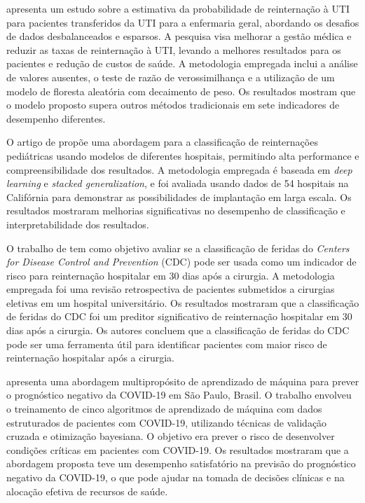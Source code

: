  apresenta um estudo sobre a estimativa da probabilidade de reinternação à UTI para pacientes transferidos da UTI para a enfermaria geral, abordando os desafios de dados desbalanceados e esparsos. A pesquisa visa melhorar a gestão médica e reduzir as taxas de reinternação à UTI, levando a melhores resultados para os pacientes e redução de custos de saúde. A metodologia empregada inclui a análise de valores ausentes, o teste de razão de verossimilhança e a utilização de um modelo de floresta aleatória com decaimento de peso. Os resultados mostram que o modelo proposto supera outros métodos tradicionais em sete indicadores de desempenho diferentes.

O artigo de  propõe uma abordagem para a classificação de reinternações pediátricas usando modelos de diferentes hospitais, permitindo alta performance e compreensibilidade dos resultados. A metodologia empregada é baseada em \textit{deep learning} e \textit{stacked generalization}, e foi avaliada usando dados de 54 hospitais na Califórnia para demonstrar as possibilidades de implantação em larga escala. Os resultados mostraram melhorias significativas no desempenho de classificação e interpretabilidade dos resultados.

O trabalho de  tem como objetivo avaliar se a classificação de feridas do \textit{Centers for Disease Control and Prevention} (CDC) pode ser usada como um indicador de risco para reinternação hospitalar em 30 dias após a cirurgia. A metodologia empregada foi uma revisão retrospectiva de pacientes submetidos a cirurgias eletivas em um hospital universitário. Os resultados mostraram que a classificação de feridas do CDC foi um preditor significativo de reinternação hospitalar em 30 dias após a cirurgia. Os autores concluem que a classificação de feridas do CDC pode ser uma ferramenta útil para identificar pacientes com maior risco de reinternação hospitalar após a cirurgia.

 apresenta uma abordagem multipropósito de aprendizado de máquina para prever o prognóstico negativo da COVID-19 em São Paulo, Brasil. O trabalho envolveu o treinamento de cinco algoritmos de aprendizado de máquina com dados estruturados de pacientes com COVID-19, utilizando técnicas de validação cruzada e otimização bayesiana. O objetivo era prever o risco de desenvolver condições críticas em pacientes com COVID-19. Os resultados mostraram que a abordagem proposta teve um desempenho satisfatório na previsão do prognóstico negativo da COVID-19, o que pode ajudar na tomada de decisões clínicas e na alocação efetiva de recursos de saúde.

